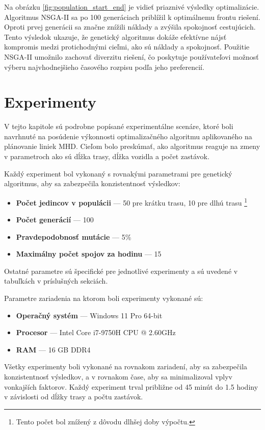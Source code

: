 Na obrázku \ref{fig:population_start_end} je vidieť priaznivé výsledky optimalizácie.
Algoritmus NSGA-II sa po 100 generáciach priblížil k optimálnemu frontu riešení.
Oproti prvej generácii sa značne znížili náklady a zvýšila spokojnosť cestujúcich.
Tento výsledok ukazuje, že genetický algoritmus dokáže efektívne nájsť kompromis medzi protichodnými cieľmi, ako sú náklady a spokojnosť.
Použitie NSGA-II umožnilo zachovať diverzitu riešení, čo poskytuje používateľovi možnosť výberu najvhodnejšieho časového rozpisu podľa jeho preferencií.
\chapter{Experimenty} %
\label{experimenty}

V tejto kapitole sú podrobne popísané experimentálne scenáre, ktoré boli navrhnuté na posúdenie výkonnosti optimalizačného algoritmu aplikovaného na plánovanie liniek MHD.
Cieľom bolo preskúmať, ako algoritmus reaguje na zmeny v parametroch ako sú dĺžka trasy, dĺžka vozidla a počet zastávok.

Každý experiment bol vykonaný s rovnakými parametrami pre genetický algoritmus, aby sa zabezpečila konzistentnosť výsledkov:
\begin{itemize}
  \item \textbf{Počet jedincov v populácii} --- 50 pre krátku trasu, 10 pre dlhú trasu \footnote{Tento počet bol znížený z dôvodu dlhšej doby výpočtu.}
  \item \textbf{Počet generácií} --- 100
  \item \textbf{Pravdepodobnosť mutácie} --- 5\%
  \item \textbf{Maximálny počet spojov za hodinu} --- 15
\end{itemize}
Ostatné parametre sú špecifické pre jednotlivé experimenty a sú uvedené v tabuľkách v príslušných sekciách.

Parametre zariadenia na ktorom boli experimenty vykonané sú:
\begin{itemize}
  \item \textbf{Operačný systém} --- Windows 11 Pro 64-bit
  \item \textbf{Procesor} --- Intel Core i7-9750H CPU @ 2.60GHz
  \item \textbf{RAM} --- 16 GB DDR4
\end{itemize}

Všetky experimenty boli vykonané na rovnakom zariadení, aby sa zabezpečila konzistentnosť výsledkov,
a v rovnakom čase, aby sa minimalizoval vplyv vonkajších faktorov.
Každý experiment trval približne od 45 minút do 1.5 hodiny v závislosti od dĺžky trasy a počtu zastávok.

